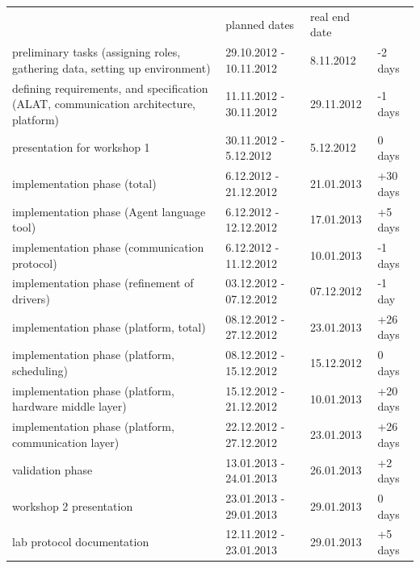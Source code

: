 \documentclass{scrreprt}
\begin{document}
\vspace{0.2in}
\begin{tabular}{|>{\raggedright}m{5cm}|l|l|l|}
\hline \multicolumn{4}{|c|}{\textbf{Planned and real dates}}\\
\hline
			&  planned dates			& real end date		& 		\\\hline
preliminary tasks (assigning roles, gathering data, setting up environment)
&  29.10.2012 - 10.11.2012		& 8.11.2012	 	& -2 days	\\\hline

defining requirements, and specification (ALAT, communication architecture, platform)
&  11.11.2012 - 30.11.2012		& 29.11.2012	 	& -1 days	\\\hline

presentation for workshop 1
&  30.11.2012 - 5.12.2012				& 5.12.2012	 	& 0 days	\\\hline

implementation phase (total)
&  6.12.2012 - 21.12.2012			& 21.01.2013	 	& +30 days	\\\hline

implementation phase (Agent language tool)
&  6.12.2012 - 12.12.2012			& 17.01.2013	 	& +5 days	\\\hline

implementation phase (communication protocol)
&  6.12.2012 - 11.12.2012			& 10.01.2013	 	& -1 days	\\\hline

implementation phase (refinement of drivers)
&  03.12.2012 - 07.12.2012			& 07.12.2012	 	& -1 day	\\\hline

implementation phase (platform, total)
&  08.12.2012 - 27.12.2012			& 23.01.2013	 	& +26 days	\\\hline

implementation phase (platform, scheduling)
&  08.12.2012 - 15.12.2012			& 15.12.2012	 	& 0 days	\\\hline

implementation phase (platform, hardware middle layer)
&  15.12.2012 - 21.12.2012			& 10.01.2013	 	& +20 days	\\\hline

implementation phase (platform, communication layer)
&  22.12.2012 - 27.12.2012			& 23.01.2013	 	& +26 days	\\\hline

validation phase
&  13.01.2013 - 24.01.2013			& 26.01.2013	 	& +2 days	\\\hline

workshop 2 presentation
&  23.01.2013 - 29.01.2013			& 29.01.2013	 	& 0 days	\\\hline

lab protocol documentation
&  12.11.2012 - 23.01.2013			& 29.01.2013	 	& +5 days	\\\hline

\hline
\end{tabular}
\end{document}
